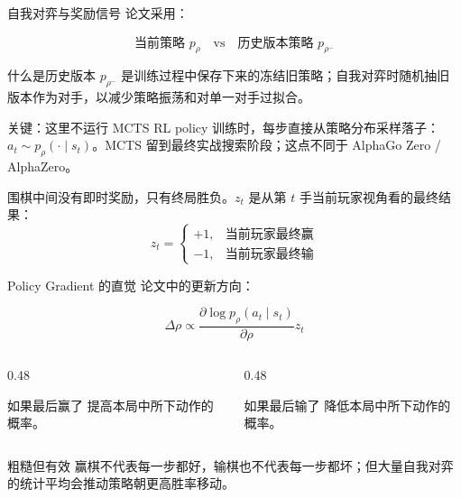 \documentclass[UTF8,aspectratio=169,10pt]{ctexbeamer}
\begin{document}
\begin{frame}{自我对弈与奖励信号}
  \footnotesize
  论文采用：

  \[
    \text{当前策略 } p_{\rho}
    \quad \text{vs} \quad
    \text{历史版本策略 } p_{\rho^-}
  \]

  \begin{block}{什么是历史版本}
    $p_{\rho^-}$ 是训练过程中保存下来的冻结旧策略；自我对弈时随机抽旧版本作为对手，以减少策略振荡和对单一对手过拟合。
  \end{block}

  \begin{alertblock}{关键：这里不运行 MCTS}
    RL policy 训练时，每步直接从策略分布采样落子：$a_t \sim p_{\rho}(\cdot\mid s_t)$。MCTS 留到最终实战搜索阶段；这点不同于 AlphaGo Zero / AlphaZero。
  \end{alertblock}

  围棋中间没有即时奖励，只有终局胜负。$z_t$ 是从第 $t$ 手当前玩家视角看的最终结果：
  \[
    z_t =
    \begin{cases}
      +1, & \text{当前玩家最终赢}\\
      -1, & \text{当前玩家最终输}
    \end{cases}
  \]
\end{frame}

\begin{frame}{Policy Gradient 的直觉}
  论文中的更新方向：

  \[
    \Delta \rho \propto
    \frac{\partial \log p_{\rho}(a_t\mid s_t)}{\partial \rho}
    z_t
  \]

  \begin{columns}[T,onlytextwidth]
    \begin{column}{0.48\textwidth}
      \begin{block}{如果最后赢了}
        提高本局中所下动作的概率。
      \end{block}
    \end{column}
    \begin{column}{0.48\textwidth}
      \begin{block}{如果最后输了}
        降低本局中所下动作的概率。
      \end{block}
    \end{column}
  \end{columns}

  \vspace{0.4cm}
  \begin{alertblock}{粗糙但有效}
    赢棋不代表每一步都好，输棋也不代表每一步都坏；但大量自我对弈的统计平均会推动策略朝更高胜率移动。
  \end{alertblock}
\end{frame}
\end{document}

